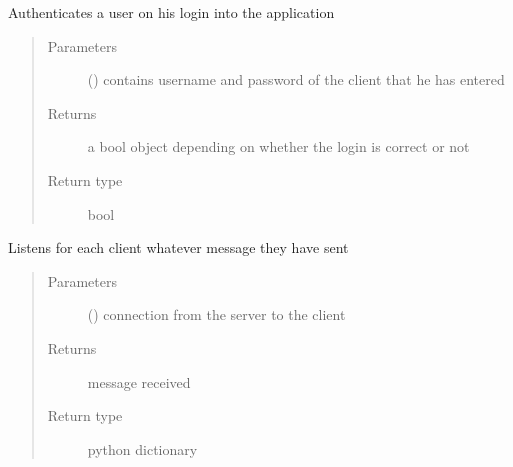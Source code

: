 \documentclass[letterpaper,10pt,english]{sphinxmanual}
\begin{document}
\begin{fulllineitems}
\label{\detokenize{main_server:main_server.loginpage}}
Authenticates a user on his login into the application
\begin{quote}\begin{description}
\item[{Parameters}] \leavevmode
{} () \textendash{} contains username and password of the client that he has entered

\item[{Returns}] \leavevmode
a bool object depending on whether the login is correct or not

\item[{Return type}] \leavevmode
bool

\end{description}\end{quote}

\end{fulllineitems}


\begin{fulllineitems}
\label{\detokenize{main_server:main_server.random}}\pysiglinewithargsret{\sphinxcode{\sphinxupquote{main\_server.}}\sphinxbfcode{\sphinxupquote{random}}}{}{{ $\rightarrow$ x in the interval {[}0, 1).}}
\end{fulllineitems}


\begin{fulllineitems}
\label{\detokenize{main_server:main_server.rec_query}}
Listens for each client whatever message they have sent
\begin{quote}\begin{description}
\item[{Parameters}] \leavevmode
{} () \textendash{} connection from the server to the client

\item[{Returns}] \leavevmode
message received

\item[{Return type}] \leavevmode
python dictionary

\end{description}\end{quote}

\end{fulllineitems}
\end{document}
